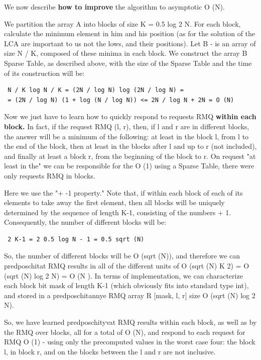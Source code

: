 We now describe \textbf{how to improve} the algorithm to asymptotic O (N).

We partition the array A into blocks of size K = 0.5 log 2 N. For each block, calculate the minimum element in him and his position (as for the solution of the LCA are important to us not the lows, and their positions). Let B - is an array of size N / K, composed of these minima in each block. We construct the array B Sparse Table, as described above, with the size of the Sparse Table and the time of its construction will be:

\begin{verbatim}
 N / K log N / K = (2N / log N) log (2N / log N) =
 = (2N / log N) (1 + log (N / log N)) <= 2N / log N + 2N = O (N) 
\end{verbatim}
Now we just have to learn how to quickly respond to requests RMQ \textbf{within each block.} In fact, if the request RMQ (l, r), then, if l and r are in different blocks, the answer will be a minimum of the following: at least in the block l, from l to the end of the block, then at least in the blocks after l and up to r (not included), and finally at least a block r, from the beginning of the block to r. On request "at least in the" we can be responsible for the O (1) using a Sparse Table, there were only requests RMQ in blocks.

Here we use the "+ -1 property." Note that, if within each block of each of its elements to take away the first element, then all blocks will be uniquely determined by the sequence of length K-1, consisting of the numbers + 1. Consequently, the number of different blocks will be:

\begin{verbatim}
 2 K-1 = 2 0.5 log N - 1 = 0.5 sqrt (N) 
\end{verbatim}
So, the number of different blocks will be O (sqrt (N)), and therefore we can predposchitat RMQ results in all of the different units of O (sqrt (N) K 2) = O (sqrt (N) log 2 N) = O (N ). In terms of implementation, we can characterize each block bit mask of length K-1 (which obviously fits into standard type int), and stored in a predposchitannye RMQ array R [mask, l, r] size O (sqrt (N) log 2 N).

So, we have learned predposchityvat RMQ results within each block, as well as by the RMQ over blocks, all for a total of O (N), and respond to each request for RMQ O (1) - using only the precomputed values ​​in the worst case four: the block l, in block r, and on the blocks between the l and r are not inclusive.

